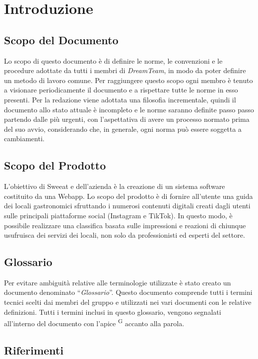 \section{Introduzione}

\subsection{Scopo del Documento}
Lo scopo di questo documento è di definire le norme, le convenzioni e le procedure adottate da tutti i membri di \textit{DreamTeam}, in modo da poter definire un metodo di lavoro comune.
Per raggiungere questo scopo ogni membro è tenuto a visionare periodicamente il documento e a rispettare tutte le norme in esso presenti. 
Per la redazione viene adottata una filosofia incrementale, quindi il documento allo stato attuale è incompleto e le norme saranno definite passo passo partendo dalle più urgenti, con l'aspettativa di avere un processo normato prima del suo avvio, considerando che, in generale, ogni norma può essere soggetta a cambiamenti.


\subsection{Scopo del Prodotto}
L’obiettivo di Sweeat e dell’azienda \zd è la creazione di un sistema software costituito da una Webapp. Lo scopo del prodotto è di fornire all’utente una guida dei locali gastronomici sfruttando i numerosi contenuti digitali creati dagli utenti sulle principali piattaforme social (Instagram e TikTok).
In questo modo, è possibile realizzare una classifica basata sulle impressioni e reazioni di chiunque usufruisca dei servizi dei locali, non solo da professionisti ed esperti del settore.


\subsection{Glossario}
Per evitare ambiguità relative alle terminologie utilizzate è stato creato un documento denominato “\textit{Glossario}”. Questo documento comprende tutti i termini tecnici scelti dai membri del gruppo e utilizzati nei vari documenti con le relative definizioni. Tutti i termini inclusi in questo glossario, vengono segnalati all'interno del documento con l'apice \textsuperscript{G} accanto alla parola.

\subsection{Riferimenti}
